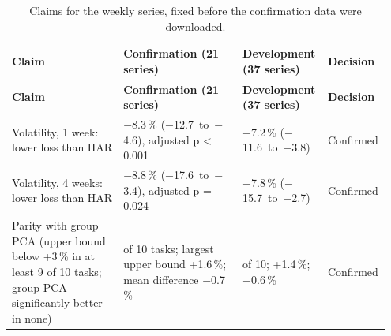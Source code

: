 {\scriptsize\setlength{\tabcolsep}{4pt}\renewcommand{\arraystretch}{1.2}
\begin{longtable}{@{}>{\raggedright\arraybackslash}p{0.299\linewidth}>{\raggedright\arraybackslash}p{0.317\linewidth}>{\raggedright\arraybackslash}p{0.214\linewidth}>{\raggedright\arraybackslash}p{0.123\linewidth}@{}}
\caption{Claims for the weekly series, fixed before the confirmation data were downloaded.}\label{tab:3}\\
\toprule
\textbf{Claim} & \textbf{Confirmation (21 series)} & \textbf{Development (37 series)} & \textbf{Decision} \\
\midrule
\endfirsthead
\toprule
\textbf{Claim} & \textbf{Confirmation (21 series)} & \textbf{Development (37 series)} & \textbf{Decision} \\
\midrule
\endhead
\bottomrule
\endlastfoot
Volatility, 1 week: lower loss than HAR & \ensuremath{-}8.3\,\% (\ensuremath{-}12.7~to~\ensuremath{-}4.6), adjusted p < 0.001 & \ensuremath{-}7.2\,\% (\ensuremath{-}11.6~to~\ensuremath{-}3.8) & Confirmed \\
Volatility, 4 weeks: lower loss than HAR & \ensuremath{-}8.8\,\% (\ensuremath{-}17.6~to~\ensuremath{-}3.4), adjusted p = 0.024 & \ensuremath{-}7.8\,\% (\ensuremath{-}15.7~to~\ensuremath{-}2.7) & Confirmed \\
Parity with group PCA (upper bound below +3\,\% in at least 9 of 10 tasks; group PCA significantly better in none) & 10 of 10 tasks; largest upper bound +1.6\,\%; mean difference \ensuremath{-}0.7\,\% & 10 of 10; +1.4\,\%; \ensuremath{-}0.6\,\% & Confirmed \\
\end{longtable}}
